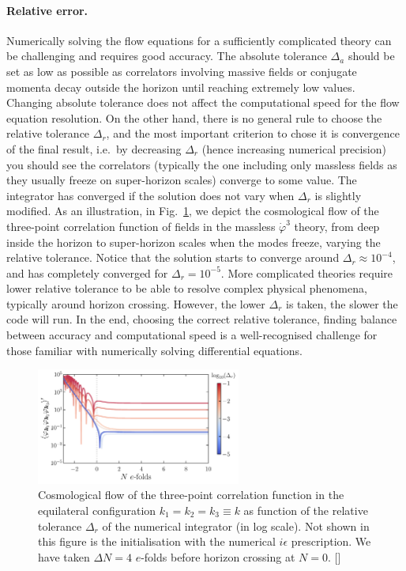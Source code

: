 \documentclass[11pt]{article}
\numberwithin{equation}{section} %
\begin{document}
\paragraph{Relative error.} Numerically solving the flow equations for a sufficiently complicated theory can be challenging and requires good accuracy. The absolute tolerance $\Delta_a$ should be set as low as possible as correlators involving massive fields or conjugate momenta decay outside the horizon until reaching extremely low values. Changing absolute tolerance does not affect the computational speed for the flow equation resolution. On the other hand, there is no general rule to choose the relative tolerance $\Delta_r$, and the most important criterion to chose it is convergence of the final result, i.e.~by decreasing $\Delta_r$ (hence increasing numerical precision) you should see the correlators (typically the one including only massless fields as they usually freeze on super-horizon scales) converge to some value. The integrator has converged if the solution does not vary when $\Delta_r$ is slightly modified. As an illustration, in Fig.~\ref{fig: Masslessdphi3 relative error}, we depict the cosmological flow of the three-point correlation function of fields in the massless $\dot{\varphi}^3$ theory, from deep inside the horizon to super-horizon scales when the modes freeze, varying the relative tolerance. Notice that the solution starts to converge around $\Delta_r \approx 10^{-4}$, and has completely converged for $\Delta_r = 10^{-5}$. More complicated theories require lower relative tolerance to be able to resolve complex physical phenomena, typically around horizon crossing. However, the lower $\Delta_r$ is taken, the slower the code will run. In the end, choosing the correct relative tolerance, finding balance between accuracy and computational speed is a well-recognised challenge for those familiar with numerically solving differential equations.

\begin{figure}[h!]
  \centering
  \includegraphics[width=0.6\textwidth]{Figures/Masslessdphi3_RelativeError.pdf}
  \vspace*{0.2cm}
  \caption{Cosmological flow of the three-point correlation function in the equilateral configuration $k_1=k_2=k_3 \equiv k$ as function of the relative tolerance $\Delta_r$ of the numerical integrator (in log scale). Not shown in this figure is the initialisation with the numerical $i\epsilon$ prescription. We have taken $\Delta N=4$ $e$-folds before horizon crossing at $N=0$. [\href{https://github.com/deniswerth/CosmoFlow/blob/main/CosmoFlow/Massless_dphi3/PossibleIssues.ipynb}{\faGithub}]}
  \label{fig: Masslessdphi3 relative error}
\end{figure}
\end{document}
